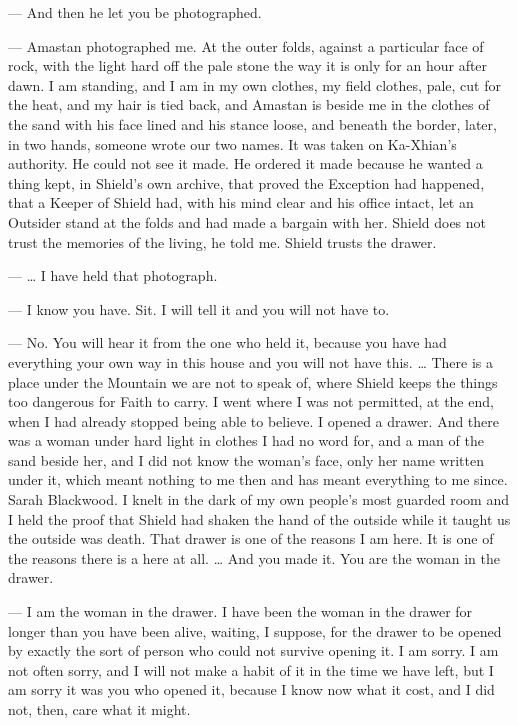 \begin{room}

--- And then he let you be photographed.

--- Amastan photographed me. At the outer folds, against a particular face of rock, with the light hard off the pale stone the way it is only for an hour after dawn. I am standing, and I am in my own clothes, my field clothes, pale, cut for the heat, and my hair is tied back, and Amastan is beside me in the clothes of the sand with his face lined and his stance loose, and beneath the border, later, in two hands, someone wrote our two names. It was taken on Ka-Xhian's authority. He could not see it made. He ordered it made because he wanted a thing kept, in Shield's own archive, that proved the Exception had happened, that a Keeper of Shield had, with his mind clear and his office intact, let an Outsider stand at the folds and had made a bargain with her. Shield does not trust the memories of the living, he told me. Shield trusts the drawer.

--- \ldots{} I have held that photograph.

--- I know you have. Sit. I will tell it and you will not have to.

--- No. You will hear it from the one who held it, because you have had everything your own way in this house and you will not have this. \ldots{} There is a place under the Mountain we are not to speak of, where Shield keeps the things too dangerous for Faith to carry. I went where I was not permitted, at the end, when I had already stopped being able to believe. I opened a drawer. And there was a woman under hard light in clothes I had no word for, and a man of the sand beside her, and I did not know the woman's face, only her name written under it, which meant nothing to me then and has meant everything to me since. Sarah Blackwood. I knelt in the dark of my own people's most guarded room and I held the proof that Shield had shaken the hand of the outside while it taught us the outside was death. That drawer is one of the reasons I am here. It is one of the reasons there is a here at all. \ldots{} And you made it. You are the woman in the drawer.

--- I am the woman in the drawer. I have been the woman in the drawer for longer than you have been alive, waiting, I suppose, for the drawer to be opened by exactly the sort of person who could not survive opening it. I am sorry. I am not often sorry, and I will not make a habit of it in the time we have left, but I am sorry it was you who opened it, because I know now what it cost, and I did not, then, care what it might.

\end{room}

